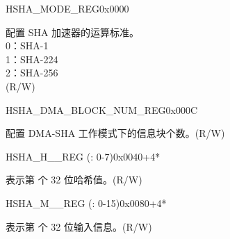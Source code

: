 \begin{register}{H}{SHA\_MODE\_REG}{0x0000}\label{regdesc:SHAMODEREG}
%
%
\regnewline%
\begin{regdesc}\begin{reglist}
\label{fielddesc:SHAMODE}\item [SHA\_MODE] 配置 SHA 加速器的运算标准。\\
0：SHA-1\\
1：SHA-224\\
2：SHA-256\\
(R/W)
\end{reglist}\end{regdesc}
\end{register}



\begin{register}{H}{SHA\_DMA\_BLOCK\_NUM\_REG}{0x000C}\label{regdesc:SHADMABLOCKNUMREG}
%
%
\regnewline%
\begin{regdesc}\begin{reglist}
\label{fielddesc:SHADMABLOCKNUM}\item [SHA\_DMA\_BLOCK\_NUM] 配置 DMA-SHA 工作模式下的信息块个数。(R/W)
\end{reglist}\end{regdesc}
\end{register}

\begin{register}{H}{SHA\_H\_\_REG (: 0-7)}{0x0040+4*}\label{regdesc:SHAHNREG}
%
\regnewline%
\begin{regdesc}\begin{reglist}
\label{fielddesc:SHAH0}\item [SHA\_H\_\regindex{n}] 表示第  个 32 位哈希值。(R/W)
\end{reglist}\end{regdesc}
\end{register}


\begin{register}{H}{SHA\_M\_\_REG (: 0-15)}{0x0080+4*}\label{regdesc:SHAMNREG}
%
\begin{regdesc}\begin{reglist}
\label{fielddesc:SHAM0}\item [SHA\_M\_\regindex{n}] 表示第  个 32 位输入信息。(R/W)
\end{reglist}\end{regdesc}
\end{register}
